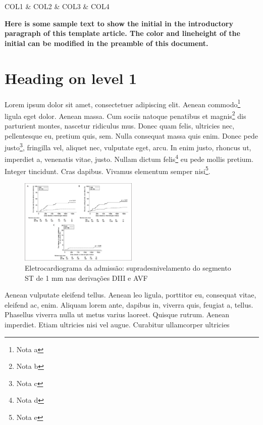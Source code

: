 {
}
{ \FL
	COL1 & COL2 & COL3 & COL4 \NN
}

\textbf{Here is some sample text to show the initial in the introductory paragraph of this template article. The color and lineheight of the initial can be modified in the preamble of this document.}

\section*{Heading on level 1}
Lorem ipsum dolor sit amet, consectetuer adipiscing elit. Aenean commodo\footnote{Nota a} ligula
eget dolor. Aenean massa. Cum sociis natoque penatibus et magnis\footnote{Nota b} dis parturient
montes, nascetur ridiculus mus. Donec quam felis, ultricies nec, pellentesque
eu, pretium quis, sem. Nulla consequat massa quis enim. Donec pede justo\footnote{Nota c},
fringilla vel, aliquet nec, vulputate eget, arcu. In enim justo, rhoncus ut,
imperdiet a, venenatis vitae, justo. Nullam dictum felis\footnote{Nota d} eu pede mollis
pretium. Integer tincidunt. Cras dapibus. Vivamus elementum semper nisi\footnote{Nota e}. 

\par
\begin{figure}[h]
	\centering
	\includegraphics[width=0.5\textwidth]{temp.png}
	\caption{Eletrocardiograma da admissão: supradesnivelamento do segmento ST de 1 mm nas derivações DIII e AVF}
	\label{Figura 1 xxx}
\end{figure}

Aenean vulputate eleifend tellus. Aenean leo ligula, porttitor eu, consequat
vitae, eleifend ac, enim. Aliquam lorem ante, dapibus in, viverra quis, feugiat
a, tellus. Phasellus viverra nulla ut metus varius laoreet. Quisque rutrum.
Aenean imperdiet. Etiam ultricies nisi vel augue. Curabitur ullamcorper
ultricies 


